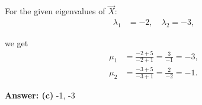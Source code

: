 \documentclass[journal]{IEEEtran}
\begin{document}
For the given eigenvalues of $\vec{X}$:
\begin{align}
\lambda_1 &= -2, \quad \lambda_2 = -3,
\end{align}

we get
\begin{align}
\mu_1 &= \frac{-2 + 5}{-2 + 1} = \frac{3}{-1} = -3, \\[4pt]
\mu_2 &= \frac{-3 + 5}{-3 + 1} = \frac{2}{-2} = -1.
\end{align}


\textbf{Answer: (c) } -1, -3
\end{document}
